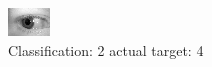\begin{figure}[h!]
\begin{center}
\includegraphics[width=0.60\columnwidth]{figures/ID792_class_2_target_4.png}
\end{center}
\caption{ Classification: 2 actual target: 4}
\label{fig:ID792_class_2_target_4}
\end{figure}
